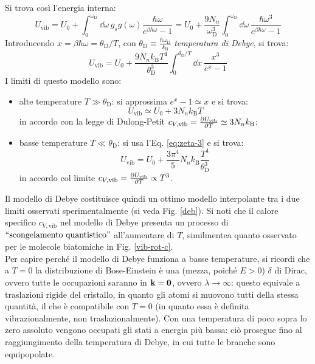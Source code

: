Si trova così l'energia interna:
\begin{equation*}
	U_\text{vib} = U_0 + \int_0^{\omega_\text{D}} \dd\omega\, g_s g(\omega) \frac{\hbar \omega}{e^{\beta \hbar \omega} - 1} = U_0 + \frac{9N_n}{\omega_\text{D}^3} \int_0^{\omega_\text{D}} \dd\omega\, \frac{\hbar \omega^3}{e^{\beta \hbar \omega} - 1}
\end{equation*}
Introducendo $ x = \beta \hbar \omega = \theta_\text{D} / T $, con $ \theta_\text{D} \equiv \frac{\hbar \omega_\text{D}}{k_\text{B}} $ \textit{temperatura di Debye}, si trova:
\begin{equation}
	U_\text{vib} = U_0 + \frac{9N_n k_\text{B} T^4}{\theta_\text{D}^3} \int_0^{\theta_\text{D}/T} \dd x\, \frac{x^3}{e^x - 1}
\end{equation}
I limiti di questo modello sono:
\begin{itemize}
	\item alte temperature $ T \gg \theta_\text{D} $: si approssima $ e^x - 1 \simeq x $ e si trova:
		\begin{equation}
			U_\text{vib} \simeq U_0 + 3 N_n k_\text{B} T
		\end{equation}
		in accordo con la legge di Dulong-Petit $ c_{V,\text{vib}} = \frac{\partial U_\text{vib}}{\partial T} \simeq 3 N_n k_\text{B} $;
	\item basse temperature $ T \ll \theta_\text{D} $: si usa l'Eq. \ref{eq:zeta-3} e si trova:
		\begin{equation}
			U_\text{vib} = U_0 + \frac{3\pi^4}{5} N_n k_\text{B} \frac{T^4}{\theta_\text{D}^3}
		\end{equation}
		in accordo col limite $ c_{V,\text{vib}} = \frac{\partial U_\text{vib}}{\partial T} \propto T^3 $.
\end{itemize}
Il modello di Debye costituisce quindi un ottimo modello interpolante tra i due limiti osservati sperimentalmente (si veda Fig. \ref{deb}). Si noti che il calore specifico $ c_{V,\text{vib}} $ nel modello di Debye presenta un processo di $ ``\text{scongelamento quantistico}" $ all'aumentare di $ T $, similmente\footnotemark a quanto osservato per le molecole biatomiche in Fig. \ref{vib-rot-c}. \\
Per capire perché il modello di Debye funziona a basse temperature, si ricordi che a $ T = 0 $ la distribuzione di Bose-Einstein è una (mezza, poiché $ E > 0 $)  $ \delta $ di Dirac, ovvero tutte le occupazioni saranno in $ \mathbf{k} = \mathbf{0} $, ovvero $ \lambda \rightarrow \infty $: questo equivale a traslazioni rigide del cristallo, in quanto gli atomi si muovono tutti della stessa quantità, il che è compatibile con $ T = 0 $ (in quanto essa è definita vibrazionalmente, non traslazionalmente). Con una temperatura di poco sopra lo zero assoluto vengono occupati gli stati a energia più bassa: ciò prosegue fino al raggiungimento della temperatura di Debye, in cui tutte le branche sono equipopolate. \\
